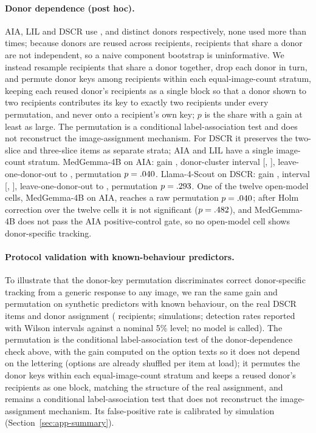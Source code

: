 \documentclass[11pt]{article}
\begin{document}
\paragraph{Donor dependence (post hoc).} AIA, LIL and DSCR use \vfourDonorNAIAMedGemma{}, \vfourDonorNLILMedGemma{} and \vfourDonorNDSCRMedGemma{} distinct donors respectively, none used more than \vfourDonorMaxAIAMedGemma{} times; because donors are reused across recipients, recipients that share a donor are not independent, so a naive component bootstrap is uninformative. We instead resample recipients that share a donor together, drop each donor in turn, and permute donor keys among recipients within each equal-image-count stratum, keeping each reused donor's recipients as a single block so that a donor shown to two recipients contributes its key to exactly two recipients under every permutation, and never onto a recipient's own key; $p$ is the share with a gain at least as large. The permutation is a conditional label-association test and does not reconstruct the image-assignment mechanism. For DSCR it preserves the \vfourStratDSCRTwo{} two-slice and \vfourStratDSCRThree{} three-slice items as separate strata; AIA and LIL have a single image-count stratum. MedGemma-4B on AIA: gain \vfourEtwoGainAIAMedGemma{}, donor-cluster interval [\vfourDonorLoAIAMedGemma{}, \vfourDonorHiAIAMedGemma{}], leave-one-donor-out \vfourDonorLooLoAIAMedGemma{} to \vfourDonorLooHiAIAMedGemma{}, permutation $p=.040{}$. Llama-4-Scout on DSCR: gain \vfourEtwoGainDSCRScout{}, interval [\vfourDonorLoDSCRScout{}, \vfourDonorHiDSCRScout{}], leave-one-donor-out \vfourDonorLooLoDSCRScout{} to \vfourDonorLooHiDSCRScout{}, permutation $p=.293{}$. One of the twelve open-model cells, MedGemma-4B on AIA, reaches a raw permutation $p=.040{}$; after Holm correction over the twelve cells it is not significant ($p=.482{}$), and MedGemma-4B does not pass the AIA positive-control gate, so no open-model cell shows donor-specific tracking.

\paragraph{Protocol validation with known-behaviour predictors.} To illustrate that the donor-key permutation discriminates correct donor-specific tracking from a generic response to any image, we ran the same gain and permutation on synthetic predictors with known behaviour, on the real DSCR items and donor assignment (\vfourDonorValN{} recipients; \vfourDonorValSims{} simulations; detection rates reported with Wilson intervals against a nominal 5\% level; no model is called). The permutation is the conditional label-association test of the donor-dependence check above, with the gain computed on the option texts so it does not depend on the lettering (options are already shuffled per item at load); it permutes the donor keys within each equal-image-count stratum and keeps a reused donor's recipients as one block, matching the structure of the real assignment, and remains a conditional label-association test that does not reconstruct the image-assignment mechanism. Its false-positive rate is calibrated by simulation (Section~\ref{sec:app-summary}). 
\end{document}
